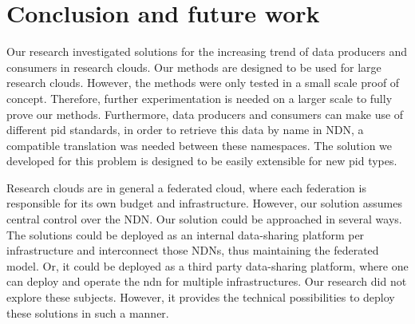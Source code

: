 \section{Conclusion and future work}
\label{fut}
\label{conc}












Our research investigated solutions for the increasing trend of data producers and consumers in research clouds. Our methods are designed to be used for large research clouds. However, the methods were only tested in a small scale proof of concept. Therefore, further experimentation is needed on a larger scale to fully prove our methods. Furthermore, data producers and consumers can make use of different \gls{pid} standards, in order to retrieve this data by name in NDN, a compatible translation was needed between these namespaces. The solution we developed for this problem is designed to be easily extensible for new \gls{pid} types. 

Research clouds are in general a federated cloud, where each federation is responsible for its own budget and infrastructure. However, our solution assumes central control over the NDN. Our solution could be approached in several ways. The solutions could be deployed as an internal data-sharing platform per infrastructure and interconnect those NDNs, thus maintaining the federated model. Or, it could be deployed as a third party data-sharing platform, where one can deploy and operate the \gls{ndn} for multiple infrastructures. Our research did not explore these subjects. However, it provides the technical possibilities to deploy these solutions in such a manner.

